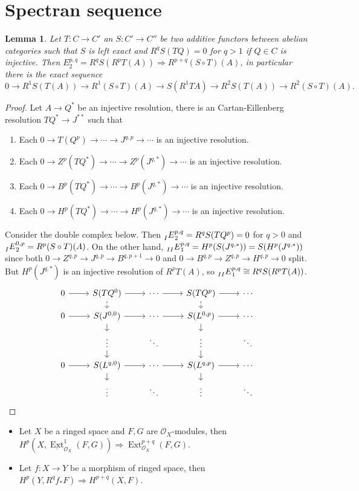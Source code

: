 \documentclass[leqno]{amsart}
\newcommand{\1}{\mathbf{1}}
\DeclareMathOperator{\Ext}{Ext}
\newtheorem{lem}[thm]{Lemma}
\theoremstyle{definition}
\theoremstyle{remark}
\begin{document}
\section{Spectran sequence}

\begin{lem}
	Let $T\colon C\to C'$ an $S\colon C'\to C''$
	be two additive functors between abelian categories
	such that $S$ is left exact 
	and $R^qS(TQ)=0$ for $q>1$ if $Q\in C$ is injective.
	Then $E^{p,q}_2=R^qS(R^pT(A))\Longrightarrow 
	R^{p+q}(S\circ T)(A)$, in particular
	there is the exact sequence
	\[
		0\to R^1S(T(A))\to R^1(S\circ T)(A)\to 
		S(R^1TA)\to R^2S(T(A))\to R^2(S\circ T)(A).
	\]
\end{lem}
\begin{proof}
	Let $A\to Q^*$ be an injective resolution,
	there is an Cartan-Eillenberg resolution
	$TQ^*\to J^{**}$ such that 
	\begin{enumerate}[label=(\alph*)]
	\item Each  
	$0\to T(Q^p)\to \cdots\to J^{q,p}\to\cdots$ 
	is an injective resolution.
	\item Each  
	$0\to Z^p(TQ^*)\to \cdots\to Z^p(J^{q,*})\to\cdots$ 
	is an injective resolution.
	\item Each  
	$0\to B^p(TQ^*)\to \cdots\to B^p(J^{q,*})\to\cdots$ 
	is an injective resolution.
	\item Each  
	$0\to H^p(TQ^*)\to \cdots\to H^p(J^{q,*})\to\cdots$ 
	is an injective resolution.
	\end{enumerate}
	Consider the double complex below.
	Then $\prescript{}{I}{E}_2^{p,q}=R^qS(TQ^p)=0$ for $q>0$
	and $\prescript{}{I}{E}_2^{0,p}=R^p(S\circ T)(A)$. 
	On the other hand, 
	$\prescript{}{II}{E}_1^{p,q}=H^p(S(J^{q,*}))=S(H^p(J^{q,*}))$
	since both
	$0\to Z^{q,p}\to J^{q,p}\to B^{q,p+1}\to 0$ and
	$0\to B^{q,p}\to Z^{q,p}\to H^{q,p}\to 0$ split.
	But $H^p(J^{q,*})$ is an injective resolution of $R^pT(A)$,
	so  $\prescript{}{II}{E}_1^{p,q}\cong R^qS(R^pT(A))$.
\[
\begin{tikzcd}[row sep=small]
	0 \arrow[r] &
	S(TQ^0) \arrow[r]\arrow[d,dashed] & \cdots \arrow[r]&
	S(TQ^p)\arrow[r]\arrow[d,dashed] & \cdots \\
	0 \arrow[r] &
	S(J^{0,0}) \arrow[r]\arrow[d] & \cdots \arrow[r]&
	S(L^{0,p}) \arrow[r]\arrow[d] & \cdots \\
	&
	\vdots \arrow[d]& \ddots&
	\vdots \arrow[d]& \ddots \\
	0 \arrow[r] &
	S(L^{q,0}) \arrow[r]\arrow[d] & \cdots \arrow[r]&
	S(L^{q,p}) \arrow[r]\arrow[d] & \cdots \\
	&
	\vdots & \ddots&
	\vdots & \ddots 
\end{tikzcd}
\]
\end{proof}
\begin{itemize}
	\item Let $X$ be a ringed space 
	and $F,G$ are $\mathcal{O}_X$-modules, then
	$H^p(X,\underline{\Ext}^1_{\mathcal{O}_X}(F,G))
	\Longrightarrow \Ext^{p+q}_{\mathcal{O}_X}(F,G)$.
	\item Let $f\colon X\to Y$ be a morphism of ringed space,
	then $H^p(Y, R^qf_*F)\Longrightarrow H^{p+q}(X,F)$.
\end{itemize}
\end{document}
